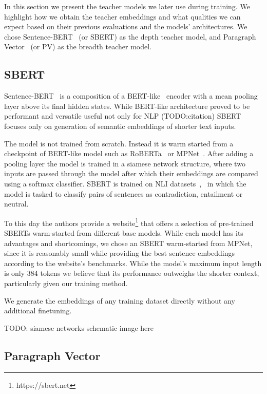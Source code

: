 In this section we present the teacher models we later use during training. We
highlight how we obtain the teacher embeddings and what qualities we can expect
based on their previous evaluations and the models' architectures. We chose
Sentence-BERT~\cite{reimers2020making} (or SBERT) as the depth teacher model,
and Paragraph Vector~\cite{le2014distributed} (or PV) as the breadth teacher
model.

\subsection{SBERT}

Sentence-BERT~\cite{reimers2019sentence} is a composition of a
BERT-like~\cite{devlin2019bert} encoder with a mean pooling layer above its
final hidden states. While BERT-like architecture proved to be performant and
versatile useful not only for NLP (TODO:citation) SBERT focuses only on
generation of semantic embeddings of shorter text inputs.

The model is not trained from scratch. Instead it is warm started from a
checkpoint of BERT-like model such as RoBERTa~\cite{liu2019roberta} or
MPNet~\cite{song2020mpnet}. After adding a pooling layer the model is trained in
a siamese network structure, where two inputs are passed through the model after
which their embeddings are compared using a softmax classifier. SBERT is trained
on NLI datasets~\cite{bowman2015large},~\cite{williams2017broad} in which the
model is tasked to classify pairs of sentences as contradiction, entailment or
neutral.

To this day the authors provide a website\footnote{https://sbert.net} that
offers a selection of pre-trained SBERTs warm-started from different base
models. While each model has its advantages and shortcomings, we chose an SBERT
warm-started from MPNet, since it is reasonably small while providing the best
sentence embeddings according to the website's benchmarks. While the model's
maximum input length is only 384 tokens we believe that its performance
outweighs the shorter context, particularly given our training method.

We generate the embeddings of any training dataset directly without any
additional finetuning.

TODO: siamese networks schematic image here

\subsection{Paragraph Vector}

